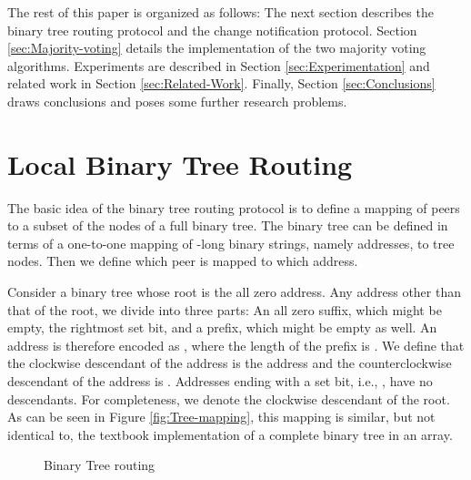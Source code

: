 \documentclass[12pt,english,journal]{elsarticle}
\numberwithin{equation}{section}
\numberwithin{figure}{section}
\theoremstyle{plain}
\theoremstyle{plain}
\begin{document}
The rest of this paper is organized as follows: The next section describes
the binary tree routing protocol and the change notification protocol.
Section \ref{sec:Majority-voting} details the implementation of the
two majority voting algorithms. Experiments are described in Section
\ref{sec:Experimentation} and related work in Section \ref{sec:Related-Work}.
Finally, Section \ref{sec:Conclusions} draws conclusions and poses
some further research problems.


\section{\label{sec:Binary-Tree-Routing}Local Binary Tree Routing}

The basic idea of the binary tree routing protocol is to define a
mapping of peers to a subset of the nodes of a full binary tree. The
binary tree can be defined in terms of a one-to-one mapping of -long
binary strings, namely addresses, to tree nodes. Then we define which
peer is mapped to which address. 

Consider a binary tree whose root is the all zero address. Any address
other than that of the root, we divide into three parts: An all zero
suffix, which might be empty, the rightmost set bit, and a prefix,
which might be empty as well. An address is therefore encoded as ,
where the length of the prefix  is . We define that the
clockwise descendant of the address  is the address 
and the counterclockwise descendant of the address  is .
Addresses ending with a set bit, i.e., , have no descendants.
For completeness, we denote  the clockwise descendant of
the root. As can be seen in Figure \ref{fig:Tree-mapping}, this mapping
is similar, but not identical to, the textbook implementation of a
complete binary tree in an array.

\begin{figure*}
\caption{Binary Tree routing}


\begin{minipage}[t]{0.5\textwidth}\end{minipage}\begin{minipage}[t]{0.5\textwidth}\end{minipage}
\end{figure*}
\end{document}
